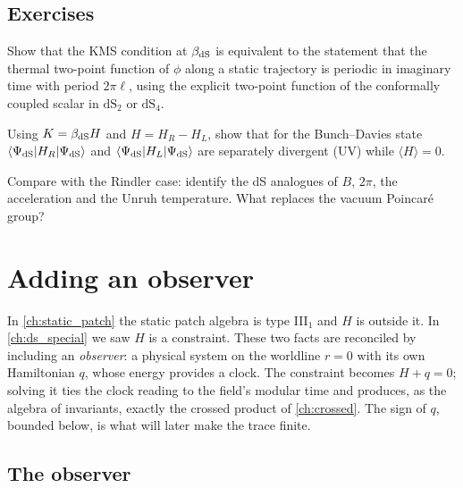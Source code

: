 \subsection*{Exercises}
\begin{exercise}\label{ex:static_patch:1}
Show that the KMS condition at $\beta_{\rm dS}$ is equivalent to the statement that the thermal two-point function of $\phi$ along a static trajectory is periodic in imaginary time with period $2\pi\ell$, using the explicit two-point function of the conformally coupled scalar in $\mathrm{dS}_2$ or $\mathrm{dS}_4$.
\end{exercise}
\begin{exercise}\label{ex:static_patch:2}
Using $K=\beta_{\rm dS}H$ and $H=H_R-H_L$, show that for the Bunch--Davies state $\langle\Psi_{\rm dS}|H_R|\Psi_{\rm dS}\rangle$ and $\langle\Psi_{\rm dS}|H_L|\Psi_{\rm dS}\rangle$ are separately divergent (UV) while $\langle H\rangle=0$.
\end{exercise}
\begin{exercise}\label{ex:static_patch:3}
Compare with the Rindler case: identify the dS analogues of $B$, $2\pi$, the acceleration and the Unruh temperature. What replaces the vacuum Poincar\'e group?
\end{exercise}

\section{Adding an observer}\label{ch:add_observer}

\mshift{23mm}\begin{physmotiv}
In \cref{ch:static_patch} the static patch algebra is type III$_1$ and $H$ is outside it. In \cref{ch:ds_special} we saw $H$ is a constraint. These two facts are reconciled by including an \emph{observer}: a physical system on the worldline $r=0$ with its own Hamiltonian $q$, whose energy provides a clock. The constraint becomes $H+q=0$; solving it ties the clock reading to the field's modular time and produces, as the algebra of invariants, exactly the crossed product of \cref{ch:crossed}. The sign of $q$, bounded below, is what will later make the trace finite.
\end{physmotiv}

\subsection{The observer}

